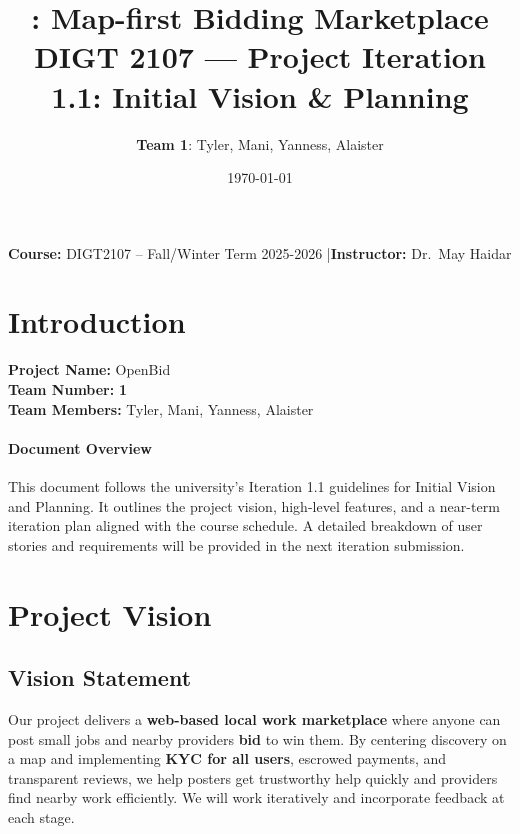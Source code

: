 \documentclass[11pt]{article}
\title{\product: Map-first Bidding Marketplace\\\Large DIGT 2107 --- Project Iteration 1.1: Initial Vision \& Planning}
\author{\textbf{Team 1}: Tyler, Mani, Yanness, Alaister}
\date{\today}
\newcommand{\product}{OpenBid}
\begin{document}
\maketitle

\begin{center}
\textbf{Course:} DIGT2107 -- Fall/Winter Term 2025-2026 \quad|\quad \textbf{Instructor:} Dr.\ May Haidar
\end{center}

\newpage

\section{Introduction}
\textbf{Project Name:} \product \\
\textbf{Team Number:} \textbf{1} \\
\textbf{Team Members:} Tyler, Mani, Yanness, Alaister

\paragraph{Document Overview}
This document follows the university's Iteration 1.1 guidelines for Initial Vision and Planning. It outlines the project vision, high-level features, and a near-term iteration plan aligned with the course schedule. A detailed breakdown of user stories and requirements will be provided in the next iteration submission.

\section{Project Vision}
\subsection*{Vision Statement}
Our project delivers a \textbf{web-based local work marketplace} where anyone can post small jobs and nearby providers \textbf{bid} to win them. By centering discovery on a map and implementing \textbf{KYC for all users}, escrowed payments, and transparent reviews, we help posters get trustworthy help quickly and providers find nearby work efficiently. We will work iteratively and incorporate feedback at each stage.
\end{document}
